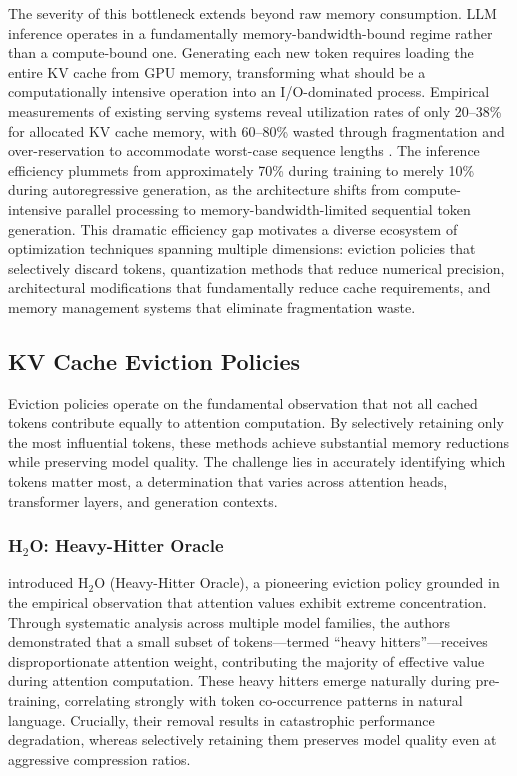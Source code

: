 The severity of this bottleneck extends beyond raw memory consumption. LLM inference operates in a fundamentally memory-bandwidth-bound regime rather than a compute-bound one. Generating each new token requires loading the entire KV cache from GPU memory, transforming what should be a computationally intensive operation into an I/O-dominated process. Empirical measurements of existing serving systems reveal utilization rates of only 20--38\% for allocated KV cache memory, with 60--80\% wasted through fragmentation and over-reservation to accommodate worst-case sequence lengths \citep{kwon2023efficient}. The inference efficiency plummets from approximately 70\% during training to merely 10\% during autoregressive generation, as the architecture shifts from compute-intensive parallel processing to memory-bandwidth-limited sequential token generation. This dramatic efficiency gap motivates a diverse ecosystem of optimization techniques spanning multiple dimensions: eviction policies that selectively discard tokens, quantization methods that reduce numerical precision, architectural modifications that fundamentally reduce cache requirements, and memory management systems that eliminate fragmentation waste.

\subsection{KV Cache Eviction Policies}

Eviction policies operate on the fundamental observation that not all cached tokens contribute equally to attention computation. By selectively retaining only the most influential tokens, these methods achieve substantial memory reductions while preserving model quality. The challenge lies in accurately identifying which tokens matter most, a determination that varies across attention heads, transformer layers, and generation contexts.

\subsubsection{H$_2$O: Heavy-Hitter Oracle}

\citet{zhang2024h2o} introduced H$_2$O (Heavy-Hitter Oracle), a pioneering eviction policy grounded in the empirical observation that attention values exhibit extreme concentration. Through systematic analysis across multiple model families, the authors demonstrated that a small subset of tokens---termed ``heavy hitters''---receives disproportionate attention weight, contributing the majority of effective value during attention computation. These heavy hitters emerge naturally during pre-training, correlating strongly with token co-occurrence patterns in natural language. Crucially, their removal results in catastrophic performance degradation, whereas selectively retaining them preserves model quality even at aggressive compression ratios.

